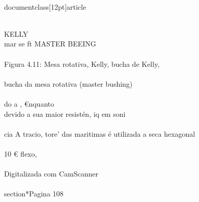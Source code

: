 \\documentclass[12pt]{article}
\begin{document}
\\
KELLY\\
mar se ft MASTER BEEING\\
\\
Figura 4.11: Mesa rotativa, Kelly, bucha de Kelly,\\
\\
bucha da mesa rotativa (master bushing)\\
\\
do a , €nquanto\\
devido a sua maior resistén, iq em soni\\
\\
cia A tracio, tore’ das maritimas é utilizada a seca hexagonal\\
\\
10 € flexo,\\
\\
Digitalizada com CamScanner\\

\\section*{Pagina 108}
\end{document}
